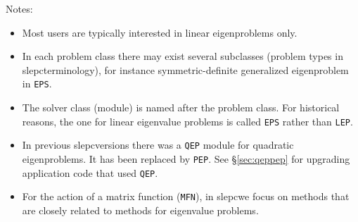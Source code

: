 \documentclass[titlepage,10pt,a4paper]{book}
\newcommand{\packnoi}[1]{{\sc #1}\xspace}
\newcommand{\slepc}{\texorpdfstring{\packnoi{slep\rm c}}{{SLEPc}}}
\begin{document}
{\noindent Notes:\vspace{-2mm}
\begin{itemize}
\setlength{\itemsep}{-2pt}
\item Most users are typically interested in linear eigenproblems only.
\item In each problem class there may exist several subclasses (problem types in \slepc terminology), for instance symmetric-definite generalized eigenproblem in \texttt{EPS}.
\item The solver class (module) is named after the problem class. For historical reasons, the one for linear eigenvalue problems is called \texttt{EPS} rather than \texttt{LEP}.
\item In previous \slepc versions there was a \texttt{QEP} module for quadratic eigenproblems. It has been replaced by \texttt{PEP}. See \S\ref{sec:qeppep} for upgrading application code that used \texttt{QEP}.
\item For the action of a matrix function (\texttt{MFN}), in \slepc we focus on methods that are closely related to methods for eigenvalue problems.
\end{itemize}

  \setlength{\parskip}{0cm}
  \tableofcontents
}
\cleardoublepage
{}
\pagestyle{fancy}
\renewcommand{\chaptermark}[1]{\markboth{\scriptsize \sffamily {\bfseries\chaptername\ \thechapter.} #1}{}}
\renewcommand{\sectionmark}[1]{\markright{\scriptsize \sffamily {\bfseries\thesection.} #1}{}}
\fancyhead{}
\fancyhead[LE,RO]{\nouppercase{\rightmark}}
\fancyhead[LO,RE]{\nouppercase{\leftmark}}
\fancyfoot[C]{\scriptsize --- \thepage\ ---}
\renewcommand{\headrulewidth}{0.2pt}
\renewcommand{\footrulewidth}{0.2pt}










\cleardoublepage
\fancyhead{}

%
%

\end{document}
